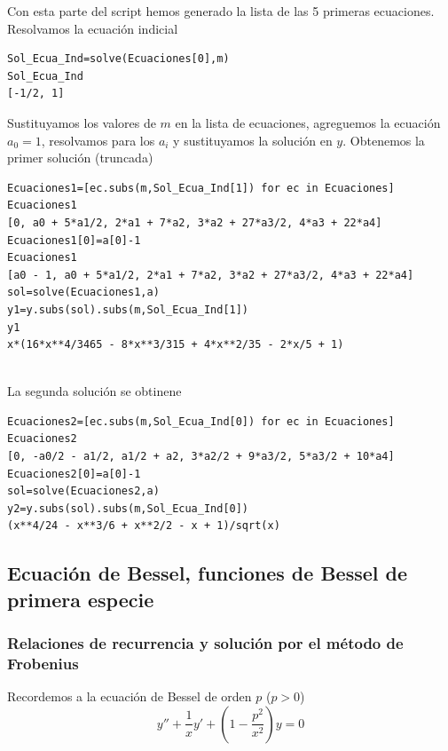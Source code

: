 \begin{ejemplo}{}
\begin{lstlisting}
\end{lstlisting}

Con esta parte del script hemos generado la lista de las 5 primeras ecuaciones.
Resolvamos la ecuación indicial

\begin{lstlisting}
Sol_Ecua_Ind=solve(Ecuaciones[0],m)
Sol_Ecua_Ind
[-1/2, 1]
\end{lstlisting}

Sustituyamos los valores de $m$ en la lista de ecuaciones, agreguemos la ecuación $a_0=1$, resolvamos para los $a_i$ y sustituyamos la solución en $y$. Obtenemos la primer solución (truncada)
\begin{lstlisting}
Ecuaciones1=[ec.subs(m,Sol_Ecua_Ind[1]) for ec in Ecuaciones]
Ecuaciones1
[0, a0 + 5*a1/2, 2*a1 + 7*a2, 3*a2 + 27*a3/2, 4*a3 + 22*a4]
Ecuaciones1[0]=a[0]-1
Ecuaciones1
[a0 - 1, a0 + 5*a1/2, 2*a1 + 7*a2, 3*a2 + 27*a3/2, 4*a3 + 22*a4]
sol=solve(Ecuaciones1,a)
y1=y.subs(sol).subs(m,Sol_Ecua_Ind[1])
y1
x*(16*x**4/3465 - 8*x**3/315 + 4*x**2/35 - 2*x/5 + 1)


\end{lstlisting}
La segunda solución se obtinene
\begin{lstlisting}
Ecuaciones2=[ec.subs(m,Sol_Ecua_Ind[0]) for ec in Ecuaciones]
Ecuaciones2
[0, -a0/2 - a1/2, a1/2 + a2, 3*a2/2 + 9*a3/2, 5*a3/2 + 10*a4]
Ecuaciones2[0]=a[0]-1
sol=solve(Ecuaciones2,a)
y2=y.subs(sol).subs(m,Sol_Ecua_Ind[0])
(x**4/24 - x**3/6 + x**2/2 - x + 1)/sqrt(x)

\end{lstlisting}



\end{ejemplo}

\subsection{Ecuación de Bessel, funciones de Bessel de primera especie}\label{sec:bessel_1}

\subsubsection{Relaciones de recurrencia y solución por el método de Frobenius}

\begin{definicion}{} Recordemos a la ecuación de Bessel de orden $p$ ($p>0$)
 \[y''+\frac{1}{x}y'+\left(1-\frac{p^2}{x^2}\right)y=0\]
\end{definicion}

